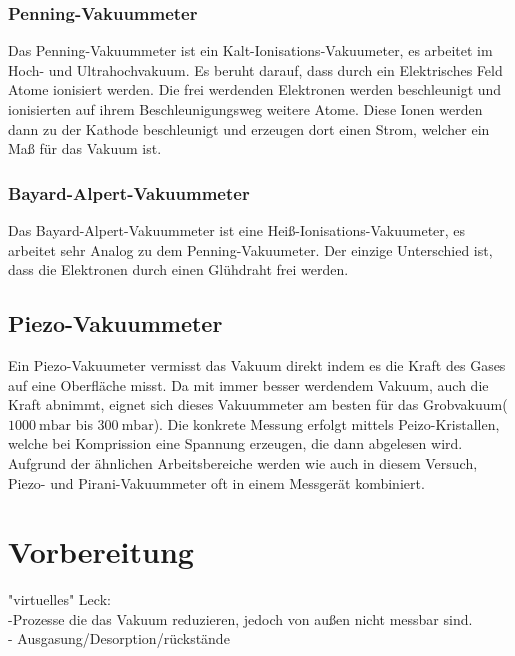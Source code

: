		\subsubsection{Penning-Vakuummeter}

			Das Penning-Vakuummeter ist ein Kalt-Ionisations-Vakuumeter, es arbeitet im Hoch- und Ultrahochvakuum. 
			Es beruht darauf, dass durch ein Elektrisches Feld Atome ionisiert werden.
			Die frei werdenden Elektronen werden beschleunigt und ionisierten auf ihrem Beschleunigungsweg weitere Atome.
			Diese Ionen werden dann zu der Kathode beschleunigt und erzeugen dort einen Strom, welcher ein Maß für das Vakuum ist.

		\subsubsection{Bayard-Alpert-Vakuummeter}

			Das Bayard-Alpert-Vakuummeter ist eine Heiß-Ionisations-Vakuumeter, es arbeitet sehr Analog zu dem Penning-Vakuumeter.
			Der einzige Unterschied ist, dass die Elektronen durch einen Glühdraht frei werden.
		
		\subsection{Piezo-Vakuummeter}
			
			Ein Piezo-Vakuumeter vermisst das Vakuum direkt indem es die Kraft des Gases auf eine Oberfläche misst. 
			Da mit immer besser werdendem Vakuum, auch die Kraft abnimmt, eignet sich dieses Vakuummeter am besten für das Grobvakuum($\SI{1000}{\milli\bar}$ bis $\SI{300}{\milli\bar}$).
			Die konkrete Messung erfolgt mittels Peizo-Kristallen, welche bei Komprission eine Spannung erzeugen, die dann abgelesen wird.
			Aufgrund der ähnlichen Arbeitsbereiche werden wie auch in diesem Versuch, Piezo- und Pirani-Vakuummeter oft in einem Messgerät kombiniert.
		

\section{Vorbereitung}      
	   "virtuelles" Leck:\\
	   	-Prozesse die das Vakuum reduzieren, jedoch von außen nicht messbar sind.\\
		- Ausgasung/Desorption/rückstände\\
